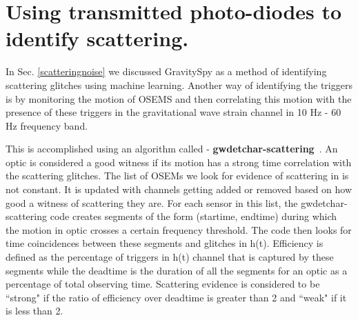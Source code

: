 \documentclass[12pt]{iopart}
\begin{document}
\par 

\vspace{0.5cm}
 


 

\section{Using transmitted photo-diodes to identify scattering.}\label{transmonwitness}
In Sec. \ref{scatteringnoise} we discussed GravitySpy as a method of identifying scattering glitches using machine learning.
Another way of identifying the triggers is by monitoring the motion of OSEMS and then correlating this motion with the presence of these triggers in the gravitational wave strain channel in 10 Hz - 60 Hz frequency band.

This is accomplished using an algorithm called - \textbf{gwdetchar-scattering}~\cite{alex_l_urban_2019_3526829}. An optic is considered a good witness if its motion has a strong time correlation with the scattering glitches. The list of OSEMs we look for evidence of scattering in is not constant. It is updated with channels getting added or removed based on how good a witness of scattering they are. For each sensor in this list, the gwdetchar-scattering code creates segments of the form (startime, endtime) during which the motion in optic crosses a certain frequency threshold.  The code then looks for time coincidences between these segments and glitches in h(t). Efficiency is defined as the percentage of triggers in h(t) channel that is captured by these segments while the deadtime is the duration of all the segments for an optic as a percentage of total observing time. Scattering evidence is considered to be ``strong" if the ratio of efficiency over deadtime is greater than 2 and ``weak" if it is less than 2. 
\end{document}
